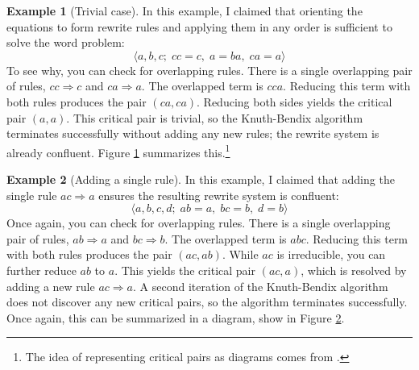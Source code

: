 \documentclass[a4paper,headsepline,bibliography=totoc,toc=flat,fleqn,twoside=semi]{scrbook}
\theoremstyle{definition}
\theoremstyle{definition}
\newtheorem{example}{Example}[chapter]
\theoremstyle{definition}
\begin{document}
\begin{example}[Trivial case]\label{trivialex}
In this example, I claimed that orienting the equations to form rewrite rules and applying them in any order is sufficient to solve the word problem:
\[\langle a,b,c;\; cc=c,\; a=ba,\; ca=a\rangle\]
To see why, you can check for overlapping rules. There is a single overlapping pair of rules, $cc\Rightarrow c$ and $ca\Rightarrow a$. The overlapped term is $cca$. Reducing this term with both rules produces the pair $(ca,ca)$. Reducing both sides yields the critical pair $(a, a)$. This critical pair is trivial, so the Knuth-Bendix algorithm terminates successfully without adding any new rules; the rewrite system is already confluent. Figure \ref{trivialfig} summarizes this.\footnote{The idea of representing critical pairs as diagrams comes from \cite{guiraud:hal-00818253}.}
\begin{figure}\label{trivialfig}
\begin{center}
\end{center}
\end{figure}
\end{example}

\begin{example}[Adding a single rule]\label{singleruleex}
In this example, I claimed that adding the single rule $ac\Rightarrow a$ ensures the resulting rewrite system is confluent:
\[\langle a, b, c, d;\; ab=a,\; bc=b,\; d=b\rangle\]
Once again, you can check for overlapping rules. There is a single overlapping pair of rules, $ab\Rightarrow a$ and $bc\Rightarrow b$. The overlapped term is $abc$. Reducing this term with both rules produces the pair $(ac,ab)$. While $ac$ is irreducible, you can further reduce $ab$ to $a$. This yields the critical pair $(ac,a)$, which is resolved by adding a new rule $ac\Rightarrow a$. A second iteration of the Knuth-Bendix algorithm does not discover any new critical pairs, so the algorithm terminates successfully. Once again, this can be summarized in a diagram, show in Figure \ref{singleruleex}.
\begin{figure}\label{singlerulefig}
\begin{center}
\end{center}
\end{figure}
\end{example}
\end{document}
